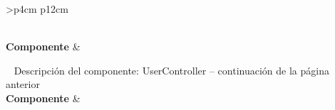 \begin{longtable}{
    >{}p{4cm}
    p{12cm}
    }
    \caption{Descripción del componente: UserController} \label{table:descripcion_usercontroller} \\
    \toprule
    \textbf{Componente} &  \\
    \endfirsthead
    
    {{ \tablename\ \thetable{} Descripción del componente: UserController -- continuación de la página anterior}} \\
    \toprule
    \textbf{Componente} &  \\
    \midrule
    \endhead
    
    \midrule
     \\ 
    \endfoot
    
    \bottomrule
    \endlastfoot
    

\end{longtable}
